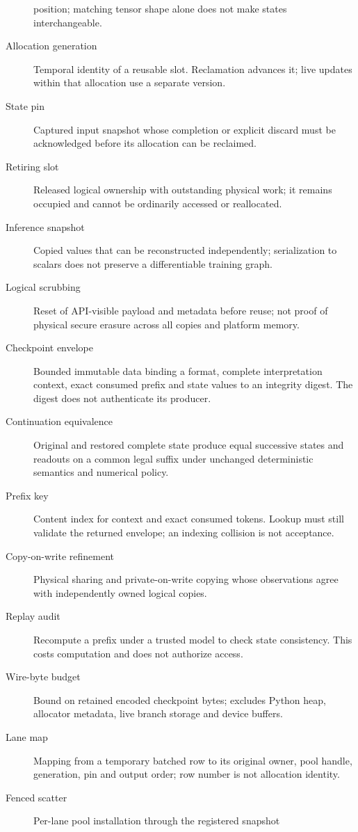 \begin{description}
position; matching tensor shape alone does not make states interchangeable.
\item[Allocation generation] Temporal identity of a reusable slot. Reclamation
advances it; live updates within that allocation use a separate version.
\item[State pin] Captured input snapshot whose completion or explicit discard
must be acknowledged before its allocation can be reclaimed.
\item[Retiring slot] Released logical ownership with outstanding physical work;
it remains occupied and cannot be ordinarily accessed or reallocated.
\item[Inference snapshot] Copied values that can be reconstructed independently;
serialization to scalars does not preserve a differentiable training graph.
\item[Logical scrubbing] Reset of API-visible payload and metadata before reuse;
not proof of physical secure erasure across all copies and platform memory.
\item[Checkpoint envelope] Bounded immutable data binding a format, complete
interpretation context, exact consumed prefix and state values to an integrity
digest. The digest does not authenticate its producer.
\item[Continuation equivalence] Original and restored complete state produce
equal successive states and readouts on a common legal suffix under unchanged
deterministic semantics and numerical policy.
\item[Prefix key] Content index for context and exact consumed tokens. Lookup
must still validate the returned envelope; an indexing collision is not acceptance.
\item[Copy-on-write refinement] Physical sharing and private-on-write copying
whose observations agree with independently owned logical copies.
\item[Replay audit] Recompute a prefix under a trusted model to check state
consistency. This costs computation and does not authorize access.
\item[Wire-byte budget] Bound on retained encoded checkpoint bytes; excludes
Python heap, allocator metadata, live branch storage and device buffers.
\item[Lane map] Mapping from a temporary batched row to its original owner,
pool handle, generation, pin and output order; row number is not allocation identity.
\item[Fenced scatter] Per-lane pool installation through the registered snapshot

\end{description}
